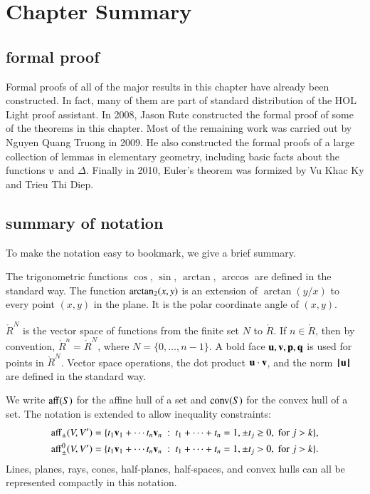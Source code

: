 \section{Chapter Summary}

\subsection{formal proof}

Formal proofs of all of the major results in this chapter have already
been constructed.  In fact, many of them are part of standard
distribution of the HOL Light proof assistant.  In 2008, Jason Rute
constructed the formal proof of some of the theorems in this chapter.
Most of the remaining work was carried out by Nguyen Quang Truong in
2009.  He also constructed the formal proofs of a large collection of
lemmas in elementary geometry, including basic facts about the
functions $\ups$ and $\Delta$.  Finally in 2010, Euler's theorem was
formized by Vu Khac Ky and Trieu Thi Diep.

\subsection{summary of notation}

To make the notation easy to bookmark, 
we give a brief summary.

The trigonometric functions $\cos$, $\sin$, $\arctan$, $\arccos$ are defined in the
standard way.  The function ${\operatorname{arctan_2}}(x,y)$ is an extension of $\arctan(y/x)$ to every point $(x,y)$
in the plane.  It is the polar coordinate angle of $(x,y)$.

 $\ring{R}^N$ is the vector space of functions from the finite set $N$ to $\ring{R}$.  If
$n\in\ring{R}$,   then by convention, $\ring{R}^n = \ring{R}^N$, where $N=\{0,\ldots,n-1\}$.
A bold face ${\mathbf u},{\mathbf v},{\mathbf p},{\mathbf q}$ is used for points in $\ring{R}^N$.   Vector space operations, the
dot product ${\mathbf u}\cdot {\mathbf v}$, and the norm ${{\hskip0.1em|\hskip-0.15em|\hskip0.1em}{\mathbf u}{\hskip0.1em|\hskip-0.15em|\hskip0.1em}}$ are defined in the standard way.

We write ${\operatorname{aff}}(S)$ for the affine hull of a set and ${\operatorname{conv}}(S)$ for the convex hull of a set.
The notation is extended to allow inequality constraints:
	\begin{align*}
{\operatorname{aff}}_{\pm} (V,V') &= \{t_1 {\mathbf v}_1 +\cdots t_n {\mathbf v}_n \ :\ 
	t_1 +\cdots+t_n = 1, \pm t_j \ge 0, \text{ for } j>k\},\\
{\operatorname{aff}}^0_{\pm} (V,V') &= \{t_1 {\mathbf v}_1 +\cdots t_n {\mathbf v}_n \ :\ 
	t_1 +\cdots+t_n = 1, \pm t_j > 0, \text{ for } j>k\}.
\end{align*}
Lines, planes, rays, cones, half-planes, half-spaces, and convex hulls
can all be represented compactly in this notation.

